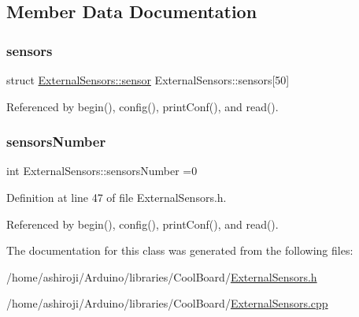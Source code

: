 \subsection{Member Data Documentation}
\mbox{\label{classExternalSensors_a284233f884fcf00154a44740cf1d9e1e}} 
\subsubsection{\texorpdfstring{sensors}{sensors}}
{\footnotesize\ttfamily struct \hyperlink{structExternalSensors_1_1sensor}{External\+Sensors\+::sensor} External\+Sensors\+::sensors\mbox{[}50\mbox{]}\hspace{0.3cm}{\ttfamily [private]}}



Referenced by begin(), config(), print\+Conf(), and read().

\mbox{\label{classExternalSensors_a58e4fbf9adeae787d92be5fa33043b5d}} 
\subsubsection{\texorpdfstring{sensors\+Number}{sensorsNumber}}
{\footnotesize\ttfamily int External\+Sensors\+::sensors\+Number =0\hspace{0.3cm}{\ttfamily [private]}}



Definition at line 47 of file External\+Sensors.\+h.



Referenced by begin(), config(), print\+Conf(), and read().



The documentation for this class was generated from the following files\+:\begin{DoxyCompactItemize}
\item 
/home/ashiroji/\+Arduino/libraries/\+Cool\+Board/\hyperlink{ExternalSensors_8h}{External\+Sensors.\+h}\item 
/home/ashiroji/\+Arduino/libraries/\+Cool\+Board/\hyperlink{ExternalSensors_8cpp}{External\+Sensors.\+cpp}\end{DoxyCompactItemize}
